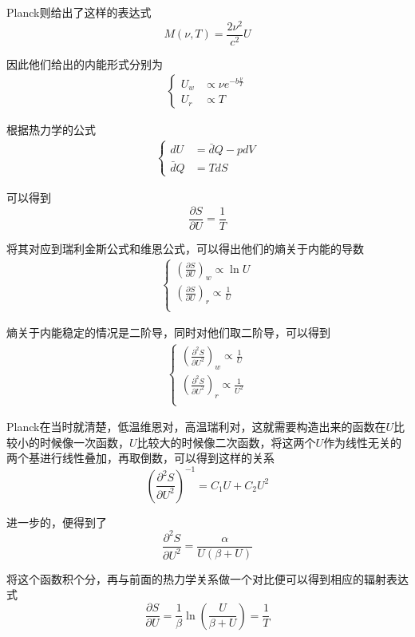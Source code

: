 \documentclass{article}
\begin{document}
Planck则给出了这样的表达式
\[M(\nu,T)=\frac{2\nu^2}{c^2}U\]

因此他们给出的内能形式分别为
\begin{align*}
    \begin{cases}
        U_w & \propto \nu e^{-b\frac{\nu}{T}} \\
        U_r & \propto T
    \end{cases}
\end{align*}

根据热力学的公式
\begin{align*}
    \begin{cases}
        dU       & =\bar{d}Q-pdV \\
        \bar{d}Q & =TdS
    \end{cases}
\end{align*}

可以得到
\[\frac{\partial S}{\partial U}=\frac{1}{T}\]

将其对应到瑞利金斯公式和维恩公式，可以得出他们的熵关于内能的导数
\begin{align*}
    \begin{cases}
        \left(\frac{\partial S}{\partial U}\right)_w  \propto\ln U        \\
        \left(\frac{\partial S}{\partial U}\right)_r  \propto \frac{1}{U} \\
    \end{cases}
\end{align*}

熵关于内能稳定的情况是二阶导，同时对他们取二阶导，可以得到
\begin{align*}
    \begin{cases}
        \left(\frac{\partial^2 S}{{\partial U}^2}\right)_w  \propto\frac{1}{U}    \\
        \left(\frac{\partial^2 S}{{\partial U}^2}\right)_r  \propto \frac{1}{U^2} \\
    \end{cases}
\end{align*}

Planck在当时就清楚，低温维恩对，高温瑞利对，这就需要构造出来的函数在$U$比较小的时候像一次函数，$U$比较大的时候像二次函数，将这两个$U$作为线性无关的两个基进行线性叠加，再取倒数，可以得到这样的关系
\[\left(\frac{\partial^2 S}{{\partial U}^2}\right)^{-1}=C_1U+C_2U^2\]

进一步的，便得到了
\[\frac{\partial^2 S}{{\partial U}^2}=\frac{\alpha}{U(\beta +U)}\]

将这个函数积个分，再与前面的热力学关系做一个对比便可以得到相应的辐射表达式
\[\frac{\partial S}{\partial U}=\frac{1}{\beta}\ln\left(\frac{U}{\beta +U}\right)=\frac{1}{T}\]
\end{document}

